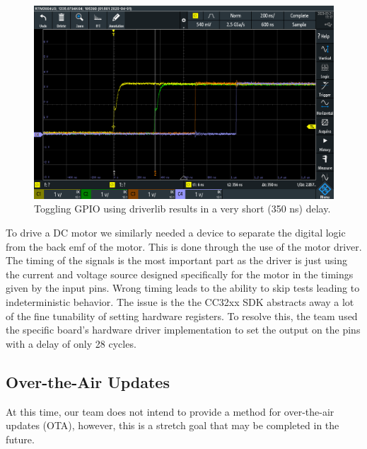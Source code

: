 \documentclass[journal]{IEEEtran}
\begin{document}
\begin{figure}[H]
	\centering
	\label{fig:gpio_toggle_driverlib}
	\includegraphics[width=\linewidth]{images/gpio_toggle_driverlib.jpg}
	\caption{Toggling GPIO using driverlib results in a very short (350 ns) delay.}
\end{figure}
To drive a DC motor we similarly needed a device to separate the digital logic from the back emf of the motor. This is done through the use of the motor driver. The timing of the signals is the most important part as the driver is just using the current and voltage source designed specifically for the motor in the timings given by the input pins. Wrong timing leads to the ability to skip tests leading to indeterministic behavior. The issue is the the CC32xx SDK abstracts away a lot of the fine tunability of setting hardware registers. To resolve this, the team used the specific board's hardware driver implementation to set the output on the pins with a delay of only 28 cycles.
\subsection{Over-the-Air Updates}
At this time, our team does not intend to provide a method for over-the-air updates (OTA), however, this is a stretch goal that may be completed in the future.
\end{document}
